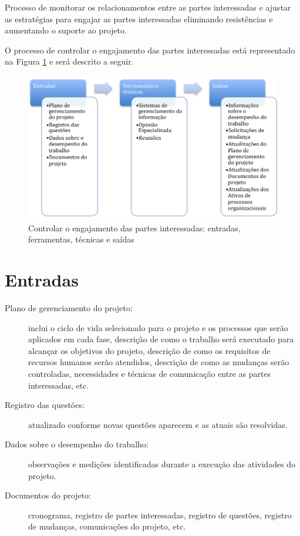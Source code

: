 Processo de monitorar os relacionamentos entre as partes interessadas e ajustar as estratégias para engajar as partes interessadas eliminando resistências e aumentando o suporte ao projeto.

O processo de controlar o engajamento das partes interessadas está representado na Figura \ref{fig:rh:engaja:cont:efts} e será descrito a seguir.

\begin{figure}[!h]
	\centering
	\includegraphics[scale=0.5]{Figuras/stakeholders_efts_cont_engaja.png}
	\caption{Controlar o engajamento das partes interessadas: entradas, ferramentas, técnicas e saídas}
	\label{fig:rh:engaja:cont:efts}
\end{figure}

\section{Entradas}

\begin{description}	

	\item[Plano de gerenciamento do projeto:] inclui o ciclo de vida selecionado para o projeto e os processos que serão aplicados em cada fase, descrição de como o trabalho será executado para alcançar os objetivos do projeto, descrição de como os requisitos de recursos humanos serão atendidos, descrição de como as mudanças serão controladas, necessidades e técnicas de comunicação entre as partes interessadas, etc.
	
	\item[Registro das questões:] atualizado conforme novas questões aparecem e as atuais são resolvidas.
	
	\item[Dados sobre o desempenho do trabalho:] observações e medições identificadas durante a execução das atividades do projeto.
	
	\item[Documentos do projeto:] cronograma, registro de partes interessadas, registro de questões, registro de mudanças, comunicações do projeto, etc.
	
\end{description}

